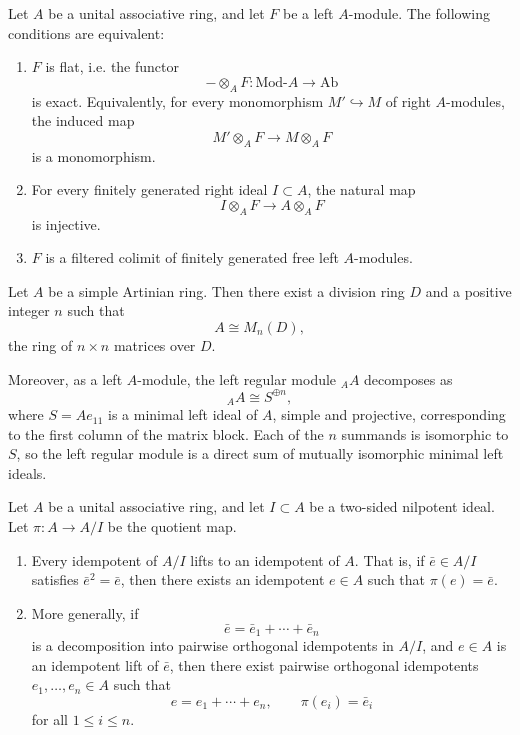 \begin{theorem}
\label{thm:flat-module-characterizations}
Let \(A\) be a unital associative ring, and let \(F\) be a left
\(A\)-module. The following conditions are equivalent:
\begin{enumerate}
    \item[(i)] \(F\) is flat, i.e. the functor
    \[
    -\otimes_A F:\mathrm{Mod}\text{-}A\longrightarrow \mathrm{Ab}
    \]
    is exact. Equivalently, for every monomorphism \(M'\hookrightarrow M\)
    of right \(A\)-modules, the induced map
    \[
    M'\otimes_A F\longrightarrow M\otimes_A F
    \]
    is a monomorphism.

    \item[(ii)] For every finitely generated right ideal \(I\subset A\), the
    natural map
    \[
    I\otimes_A F\longrightarrow A\otimes_A F
    \]
    is injective.

    \item[(iii)] \(F\) is a filtered colimit of finitely generated free left
    \(A\)-modules.
\end{enumerate}
\end{theorem}


\begin{theorem}
\label{thm:wedderburn-left-module}
Let \(A\) be a simple Artinian ring. Then there exist a division ring \(D\) and
a positive integer \(n\) such that
\[
A \cong M_n(D),
\]
the ring of \(n\times n\) matrices over \(D\).

Moreover, as a left \(A\)-module, the left regular module \({}_A A\) decomposes as
\[
{}_A A \cong S^{\oplus n},
\]
where \(S = Ae_{11}\) is a minimal left ideal of \(A\), simple and projective,
corresponding to the first column of the matrix block. Each of the \(n\) summands
is isomorphic to \(S\), so the left regular module is a direct sum of
mutually isomorphic minimal left ideals.
\end{theorem}



\begin{theorem}
\label{thm:idempotent-lifting-nilpotent-ideal}
Let \(A\) be a unital associative ring, and let \(I\subset A\) be a
two-sided nilpotent ideal. Let \(\pi:A\to A/I\) be the quotient map.

\begin{enumerate}
    \item[(i)] Every idempotent of \(A/I\) lifts to an idempotent of \(A\).
    That is, if \(\bar e\in A/I\) satisfies \(\bar e^2=\bar e\), then there
    exists an idempotent \(e\in A\) such that \(\pi(e)=\bar e\).

    \item[(ii)] More generally, if
    \[
    \bar e=\bar e_1+\cdots+\bar e_n
    \]
    is a decomposition into pairwise orthogonal idempotents in \(A/I\), and
    \(e\in A\) is an idempotent lift of \(\bar e\), then there exist pairwise
    orthogonal idempotents \(e_1,\dots,e_n\in A\) such that
    \[
    e=e_1+\cdots+e_n,
    \qquad
    \pi(e_i)=\bar e_i
    \]
    for all \(1\leq i\leq n\).
\end{enumerate}
\end{theorem}


